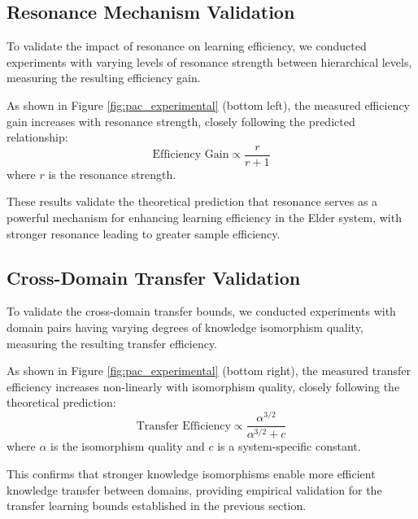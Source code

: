 \subsection{Resonance Mechanism Validation}

To validate the impact of resonance on learning efficiency, we conducted experiments with varying levels of resonance strength between hierarchical levels, measuring the resulting efficiency gain.

\begin{result}
As shown in Figure \ref{fig:pac_experimental} (bottom left), the measured efficiency gain increases with resonance strength, closely following the predicted relationship:
\begin{equation}
\text{Efficiency Gain} \propto \frac{r}{r + 1}
\end{equation}
where $r$ is the resonance strength.
\end{result}

These results validate the theoretical prediction that resonance serves as a powerful mechanism for enhancing learning efficiency in the Elder system, with stronger resonance leading to greater sample efficiency.

\subsection{Cross-Domain Transfer Validation}

To validate the cross-domain transfer bounds, we conducted experiments with domain pairs having varying degrees of knowledge isomorphism quality, measuring the resulting transfer efficiency.

\begin{result}
As shown in Figure \ref{fig:pac_experimental} (bottom right), the measured transfer efficiency increases non-linearly with isomorphism quality, closely following the theoretical prediction:
\begin{equation}
\text{Transfer Efficiency} \propto \frac{\alpha^{3/2}}{\alpha^{3/2} + c}
\end{equation}
where $\alpha$ is the isomorphism quality and $c$ is a system-specific constant.
\end{result}

This confirms that stronger knowledge isomorphisms enable more efficient knowledge transfer between domains, providing empirical validation for the transfer learning bounds established in the previous section.

